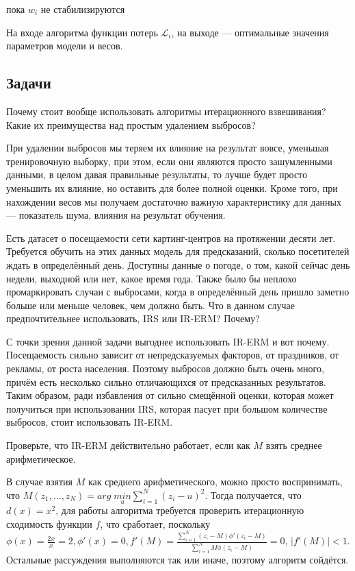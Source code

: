 пока $w_i$ не стабилизируются

На входе алгоритма функции потерь $\mathscr{L}_i$, на выходе — оптимальные значения параметров модели и весов.

\subsection{Задачи}

\problem

Почему стоит вообще использовать алгоритмы итерационного взвешивания? Какие их преимущества над простым удалением выбросов? 

\begin{solution}
    При удалении выбросов мы теряем их влияние на результат вовсе, уменьшая тренировочную выборку, при этом, если они являются просто зашумленными данными, в целом давая правильные результаты, то лучше будет просто уменьшить их влияние, но оставить для более полной оценки. Кроме того, при нахождении весов мы получаем достаточно важную характеристику для данных — показатель шума, влияния на результат обучения.
\end{solution}

\problem

Есть датасет о посещаемости сети картинг-центров на протяжении десяти лет. Требуется обучить на этих данных модель для предсказаний, сколько посетителей ждать в определённый день. Доступны данные о погоде, о том, какой сейчас день недели, выходной или нет, какое время года. Также было бы неплохо промаркировать случаи с выбросами, когда в определённый день пришло заметно больше или меньше человек, чем должно быть. Что в данном случае предпочтительнее использовать, IRS или IR-ERM? Почему?


\begin{solution}

    С точки зрения данной задачи выгоднее использовать IR-ERM и вот почему. Посещаемость сильно зависит от непредсказуемых факторов, от праздников, от рекламы, от роста населения. Поэтому выбросов должно быть очень много, причём есть несколько сильно отличающихся от предсказанных результатов. Таким образом, ради избавления от сильно смещённой оценки, которая может получиться при использовании IRS, которая пасует при большом количестве выбросов, стоит использовать IR-ERM.

\end{solution}


\problem

Проверьте, что IR-ERM действительно работает, если как $M$ взять среднее арифметическое.

\begin{solution}
    В случае взятия $M$ как среднего арифметического, можно просто воспринимать, что $M(z_1,...,z_N) = arg \; \underset{u}{min} \sum_{i=1}^N (z_i - u)^2$. Тогда получается, что $d(x) = x^2$, для работы алгоритма требуется проверить итерационную сходимость функции $f$, что сработает, поскольку $\phi (x) = \frac{2x}{x} = 2, \phi'(x) = 0, f'(M) = \frac{\sum_{i=1}^N (z_i - M) \phi'(z_i - M)}{\sum_{i=1}^N M \phi(z_i - M)} = 0$,
    $|f'(M)| < 1$. Остальные рассуждения выполняются так или иначе, поэтому алгоритм сойдётся.
\end{solution}